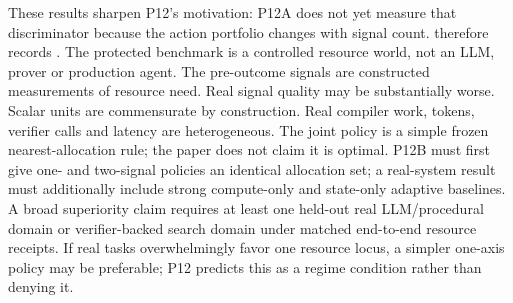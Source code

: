 \markdownRendererOlEndTight
\markdownRendererSectionEnd
{}These results sharpen P12's motivation:  P12A does not yet measure that discriminator because the action portfolio changes with signal count.  therefore records .\markdownRendererInterblockSeparator
{}\markdownRendererSectionBegin
{}\markdownRendererInterblockSeparator
{}\markdownRendererOlBeginTight
{}The protected benchmark is a controlled resource world, not an LLM, prover or production agent.\markdownRendererOlItemEnd 
{}The pre-outcome signals are constructed measurements of resource need. Real signal quality may be substantially worse.\markdownRendererOlItemEnd 
{}Scalar units are commensurate by construction. Real compiler work, tokens, verifier calls and latency are heterogeneous.\markdownRendererOlItemEnd 
{}The joint policy is a simple frozen nearest-allocation rule; the paper does not claim it is optimal.\markdownRendererOlItemEnd 
{}P12B must first give one- and two-signal policies an identical allocation set; a real-system result must additionally include strong compute-only and state-only adaptive baselines.\markdownRendererOlItemEnd 
{}A broad superiority claim requires at least one held-out real LLM/procedural domain or verifier-backed search domain under matched end-to-end resource receipts.\markdownRendererOlItemEnd 
{}If real tasks overwhelmingly favor one resource locus, a simpler one-axis policy may be preferable; P12 predicts this as a regime condition rather than denying it.\markdownRendererOlItemEnd 
\markdownRendererOlEndTight 
\markdownRendererSectionEnd 
\markdownRendererSectionEnd \markdownRendererDocumentEnd